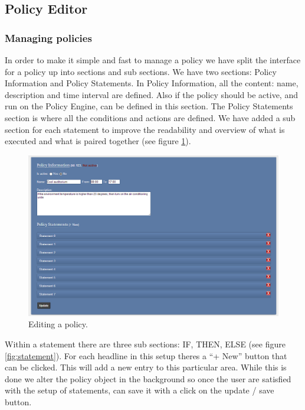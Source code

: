 \subsection{Policy Editor}

\subsubsection{Managing policies}
In order to make it simple and fast to manage a policy we have split the interface for a policy up into sections and sub sections. We have two sections: Policy Information and Policy Statements. In Policy Information, all the content: name, description and time interval are defined. Also if the policy should be active, and run on the Policy Engine, can be defined in this section. The Policy Statements section is where all the conditions and actions are defined. We have added a sub section for each statement to improve the readability and overview of what is executed and what is paired together (see figure \ref{fig:policy}).  

\begin{figure}[h!]
\centering
\includegraphics[width=\columnwidth]{policy.png}
\caption{Editing a policy.}
\label{fig:policy}
\end{figure}

Within a statement there are three sub sections: IF, THEN, ELSE (see figure \ref{fig:statement}). For each headline in this setup theres a "`+ New"' button that can be clicked. This will add a new entry to this particular area. While this is done we alter the policy object in the background so once the user are satisfied with the setup of statements, can save it with a click on the update / save button.


